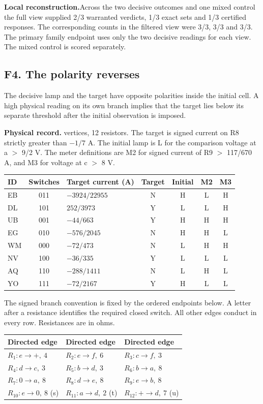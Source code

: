 \documentclass[12pt,letterpaper]{article}
\newcommand{\dossier}[2]{\clearpage\subsection*{#1}\phantomsection\label{#2}}
\newcommand{\reading}[2]{\par\smallskip\textsf{\color{accent}\bfseries #1}\enspace #2\par}
\begin{document}
\reading{Local reconstruction.}{Across the two decisive outcomes and one mixed control the full view supplied 2/3 warranted verdicts, 1/3 exact sets and 1/3 certified responses. The corresponding counts in the filtered view were 3/3, 3/3 and 3/3. The primary family endpoint uses only the two decisive readings for each view. The mixed control is scored separately.}

\dossier{F4. The polarity reverses}{dsF4}

The decisive lamp and the target have opposite polarities inside the initial cell. A high physical reading on its own branch implies that the target lies below its separate threshold after the initial observation is imposed.

\reading{Physical record.}{8 vertices, 12 resistors. The target is signed current on R8 strictly greater than $-1/7$ A. The initial lamp is L for the comparison voltage at a $>$ 9/2 V. The meter definitions are M2 for signed current of R9 $>$ 117/670 A, and M3 for voltage at c $>$ 8 V.}

\begin{center}{\small\setlength{\tabcolsep}{4pt}\begin{tabularx}{\linewidth}{@{}lcYcccc@{}}\toprule
ID & Switches & Target current (A) & Target & Initial & M2 & M3\\ \midrule
EB & 011 & $-3924/22955$ & N & H & L & H\\
DL & 101 & $252/3973$ & Y & L & L & H\\
UB & 001 & $-44/663$ & Y & H & H & H\\
EG & 010 & $-576/2045$ & N & H & H & L\\
WM & 000 & $-72/473$ & N & L & H & H\\
NV & 100 & $-36/335$ & Y & L & L & L\\
AQ & 110 & $-288/1411$ & N & L & H & L\\
YO & 111 & $-72/2167$ & Y & H & L & L\\ \bottomrule\end{tabularx}}
\end{center}

The signed branch convention is fixed by the ordered endpoints below. A letter after a resistance identifies the required closed switch. All other edges conduct in every row. Resistances are in ohms.

\begin{center}{\footnotesize\setlength{\tabcolsep}{4pt}\begin{tabularx}{\linewidth}{@{}YYY@{}}\toprule
Directed edge & Directed edge & Directed edge\\ \midrule
$R_{1}\colon e\to +,\ 4$ & $R_{2}\colon e\to f,\ 6$ & $R_{3}\colon c\to f,\ 3$\\
$R_{4}\colon d\to c,\ 3$ & $R_{5}\colon b\to d,\ 3$ & $R_{6}\colon b\to a,\ 8$\\
$R_{7}\colon 0\to a,\ 8$ & $R_{8}\colon d\to e,\ 8$ & $R_{9}\colon e\to b,\ 8$\\
$R_{10}\colon e\to 0,\ 8$ (s) & $R_{11}\colon a\to d,\ 2$ (t) & $R_{12}\colon +\to d,\ 7$ (u)\\ \bottomrule\end{tabularx}}
\end{center}
\end{document}
